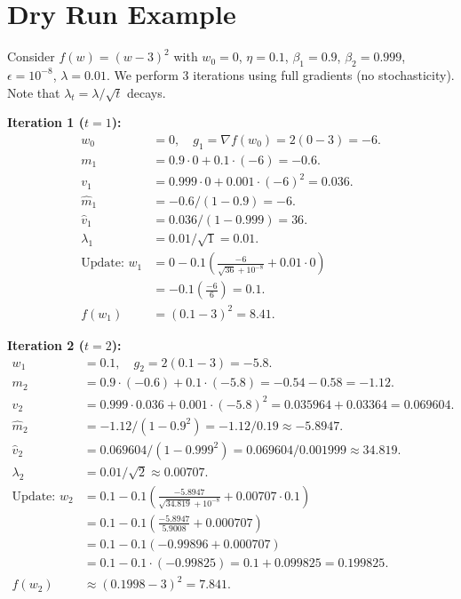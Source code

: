 \documentclass{article}
\theoremstyle{plain}
\theoremstyle{definition}
\begin{document}
\section*{Dry Run Example}

Consider $f(w) = (w - 3)^2$ with $w_0 = 0$, $\eta = 0.1$, $\beta_1 = 0.9$, $\beta_2 = 0.999$, $\epsilon = 10^{-8}$, $\lambda = 0.01$. We perform 3 iterations using full gradients (no stochasticity). Note that $\lambda_t = \lambda/\sqrt{t}$ decays.

\textbf{Iteration 1 ($t=1$):}
\begin{align*}
    w_0 &= 0, \quad g_1 = \nabla f(w_0) = 2(0-3) = -6. \\
    m_1 &= 0.9 \cdot 0 + 0.1 \cdot (-6) = -0.6. \\
    v_1 &= 0.999 \cdot 0 + 0.001 \cdot (-6)^2 = 0.036. \\
    \hat{m}_1 &= -0.6 / (1 - 0.9) = -6. \\
    \hat{v}_1 &= 0.036 / (1 - 0.999) = 36. \\
    \lambda_1 &= 0.01 / \sqrt{1} = 0.01. \\
    \text{Update: } w_1 &= 0 - 0.1 \left( \frac{-6}{\sqrt{36} + 10^{-8}} + 0.01 \cdot 0 \right) \\
    &= -0.1 \left( \frac{-6}{6} \right) = 0.1. \\
    f(w_1) &= (0.1 - 3)^2 = 8.41.
\end{align*}

\textbf{Iteration 2 ($t=2$):}
\begin{align*}
    w_1 &= 0.1, \quad g_2 = 2(0.1 - 3) = -5.8. \\
    m_2 &= 0.9 \cdot (-0.6) + 0.1 \cdot (-5.8) = -0.54 - 0.58 = -1.12. \\
    v_2 &= 0.999 \cdot 0.036 + 0.001 \cdot (-5.8)^2 = 0.035964 + 0.03364 = 0.069604. \\
    \hat{m}_2 &= -1.12 / (1 - 0.9^2) = -1.12 / 0.19 \approx -5.8947. \\
    \hat{v}_2 &= 0.069604 / (1 - 0.999^2) = 0.069604 / 0.001999 \approx 34.819. \\
    \lambda_2 &= 0.01 / \sqrt{2} \approx 0.00707. \\
    \text{Update: } w_2 &= 0.1 - 0.1 \left( \frac{-5.8947}{\sqrt{34.819} + 10^{-8}} + 0.00707 \cdot 0.1 \right) \\
    &= 0.1 - 0.1 \left( \frac{-5.8947}{5.9008} + 0.000707 \right) \\
    &= 0.1 - 0.1 \left( -0.99896 + 0.000707 \right) \\
    &= 0.1 - 0.1 \cdot (-0.99825) = 0.1 + 0.099825 = 0.199825. \\
    f(w_2) &\approx (0.1998 - 3)^2 = 7.841.
\end{align*}
\end{document}
